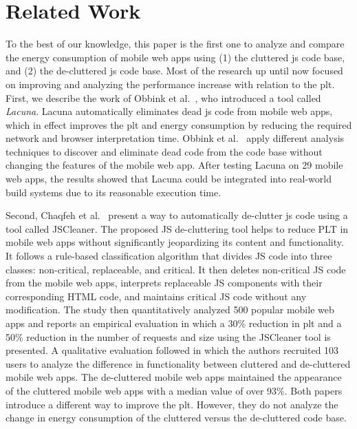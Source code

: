 

\section{Related Work}\label{sec:related}

To the best of our knowledge, this paper is the first one to analyze and compare the energy consumption of mobile web apps using (1) the cluttered \acrshort{js} code base, and (2) the de-cluttered \acrshort{js} code base. Most of the research up until now focused on improving and analyzing the performance increase with relation to the \acrshort{plt}. First, we describe the work of Obbink et al.~\cite{Lacuna}, who introduced a tool called \textit{Lacuna}. Lacuna automatically eliminates dead \acrshort{js} code from mobile web apps, which in effect improves the \acrshort{plt} and energy consumption by reducing the required network and browser interpretation time. Obbink et al.~\cite{Lacuna} apply different analysis techniques to discover and eliminate dead code from the code base without changing the features of the mobile web app. After testing Lacuna on 29 mobile web apps, the results showed that Lacuna could be integrated into real-world build systems due to its reasonable execution time. 

Second, Chaqfeh et al.~\cite{chaqfeh2020jscleaner} present a way to automatically de-clutter \acrshort{js} code using a tool called JSCleaner. The proposed JS de-cluttering tool helps to reduce PLT in mobile web apps without significantly jeopardizing its content and functionality. It follows a rule-based classification algorithm that divides JS code into three classes: non-critical, replaceable, and critical. It then deletes non-critical JS code from the mobile web apps, interprets replaceable JS components with their corresponding HTML code, and maintains critical JS code without any modification. The study then quantitatively analyzed 500 popular mobile web apps and reports an empirical evaluation in which a 30\% reduction in \acrshort{plt} and a 50\% reduction in the number of requests and size using the JSCleaner tool is presented. A qualitative evaluation followed in which the authors recruited 103 users to analyze the difference in functionality between cluttered and de-cluttered mobile web apps. The de-cluttered mobile web apps maintained the appearance of the cluttered mobile web apps with a median value of over 93\%. Both papers \cite{Lacuna, chaqfeh2020jscleaner} introduce a different way to improve the \acrshort{plt}. However, they do not analyze the change in energy consumption of the cluttered versus the de-cluttered code base. 

